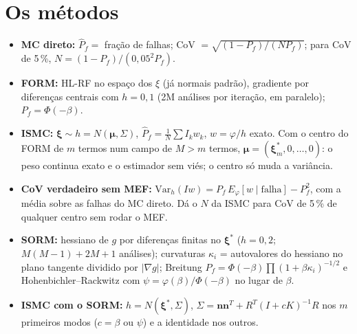 \documentclass[11pt,a4paper]{article}
\begin{document}
\section{Os métodos}
\begin{itemize}
  \item \textbf{MC direto:} $\hat P_f = $ fração de falhas; CoV $= \sqrt{(1-P_f)/(N P_f)}$; para CoV de 5\,\%,
    $N = (1-P_f)/(0{,}05^2 P_f)$.
  \item \textbf{FORM:} HL-RF no espaço dos $\xi$ (já normais padrão), gradiente por diferenças centrais com $h = 0{,}1$
    (2M análises por iteração, em paralelo); $P_f = \Phi(-\beta)$.
  \item \textbf{ISMC:} $\bm\xi \sim h = N(\bm\mu, \Sigma)$, $\hat P_f = \frac1N\sum I_k w_k$, $w = \varphi/h$ exato. Com o
    centro do FORM de $m$ termos num campo de $M > m$ termos, $\bm\mu = (\bm\xi^*_m, 0, \ldots, 0)$: o peso continua
    exato e o estimador sem viés; o centro só muda a variância.
  \item \textbf{CoV verdadeiro sem MEF:} $\mathrm{Var}_h(Iw) = P_f\,E_\varphi[w \mid \text{falha}] - P_f^2$, com a média
    sobre as falhas do MC direto. Dá o $N$ da ISMC para CoV de 5\,\% de qualquer centro sem rodar o MEF.
  \item \textbf{SORM:} hessiano de $g$ por diferenças finitas no $\bm\xi^*$ ($h = 0{,}2$; $M(M-1) + 2M + 1$ análises);
    curvaturas $\kappa_i$ = autovalores do hessiano no plano tangente dividido por $|\nabla g|$; Breitung
    $P_f = \Phi(-\beta)\prod(1+\beta\kappa_i)^{-1/2}$ e Hohenbichler--Rackwitz com $\psi = \varphi(\beta)/\Phi(-\beta)$ no
    lugar de $\beta$.
  \item \textbf{ISMC com o SORM:} $h = N(\bm\xi^*, \Sigma)$, $\Sigma = \bm n\bm n^T + R^T(I + cK)^{-1}R$ nos $m$ primeiros
    modos ($c = \beta$ ou $\psi$) e a identidade nos outros.
\end{itemize}
\end{document}
